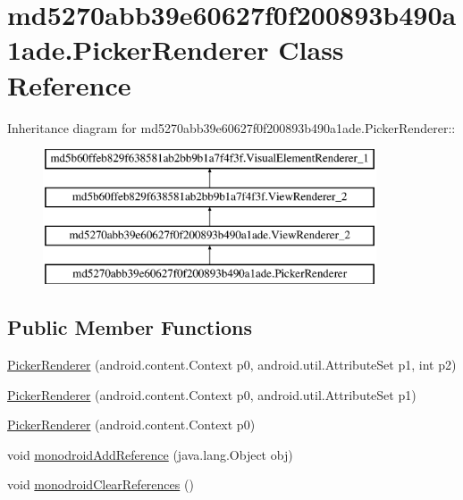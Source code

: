 \hypertarget{classmd5270abb39e60627f0f200893b490a1ade_1_1_picker_renderer}{
\section{md5270abb39e60627f0f200893b490a1ade.PickerRenderer Class Reference}
\label{classmd5270abb39e60627f0f200893b490a1ade_1_1_picker_renderer}
}
Inheritance diagram for md5270abb39e60627f0f200893b490a1ade.PickerRenderer::\begin{figure}[H]
\begin{center}
\leavevmode
\includegraphics[height=4cm]{classmd5270abb39e60627f0f200893b490a1ade_1_1_picker_renderer}
\end{center}
\end{figure}
\subsection*{Public Member Functions}
\begin{CompactItemize}
\item 
\hyperlink{classmd5270abb39e60627f0f200893b490a1ade_1_1_picker_renderer_00b8590adecab516a7110fb8577fd90a}{PickerRenderer} (android.content.Context p0, android.util.AttributeSet p1, int p2)
\item 
\hyperlink{classmd5270abb39e60627f0f200893b490a1ade_1_1_picker_renderer_156d92620e136f1f59df295adf38b21e}{PickerRenderer} (android.content.Context p0, android.util.AttributeSet p1)
\item 
\hyperlink{classmd5270abb39e60627f0f200893b490a1ade_1_1_picker_renderer_c8b874ff9d60efd6f0108f2c112b26b9}{PickerRenderer} (android.content.Context p0)
\item 
void \hyperlink{classmd5270abb39e60627f0f200893b490a1ade_1_1_picker_renderer_777d5b35ed425b737ed67a6488c800c8}{monodroidAddReference} (java.lang.Object obj)
\item 
void \hyperlink{classmd5270abb39e60627f0f200893b490a1ade_1_1_picker_renderer_8ea4822897e59386ee80a0fccf40c367}{monodroidClearReferences} ()
\end{CompactItemize}

